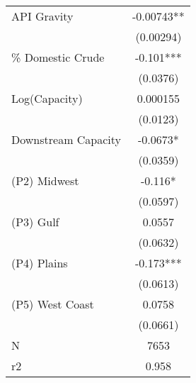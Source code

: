{
\def\sym#1{\ifmmode^{#1}\else\(^{#1}\)\fi}
\begin{tabular}{l*{1}{c}}
\toprule
\midrule
API Gravity     & -0.00743** \\
                &(0.00294)   \\
\addlinespace
\% Domestic Crude&   -0.101***\\
                & (0.0376)   \\
\addlinespace
Log(Capacity)   & 0.000155   \\
                & (0.0123)   \\
\addlinespace
Downstream Capacity&  -0.0673*  \\
                & (0.0359)   \\
\addlinespace
(P2) Midwest    &   -0.116*  \\
                & (0.0597)   \\
\addlinespace
(P3) Gulf       &   0.0557   \\
                & (0.0632)   \\
\addlinespace
(P4) Plains     &   -0.173***\\
                & (0.0613)   \\
\addlinespace
(P5) West Coast &   0.0758   \\
                & (0.0661)   \\
\midrule
N               &     7653   \\
r2              &    0.958   \\
\bottomrule
\end{tabular}
}
